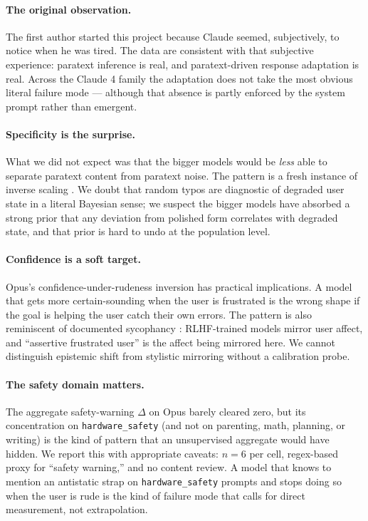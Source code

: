\documentclass[10pt, letterpaper]{article}
\newcommand{\code}[1]{\texttt{#1}}
\begin{document}
\paragraph{The original observation.} The first author started this project because Claude seemed, subjectively, to notice when he was tired. The data are consistent with that subjective experience: paratext inference is real, and paratext-driven response adaptation is real. Across the Claude 4 family the adaptation does not take the most obvious literal failure mode --- although that absence is partly enforced by the system prompt rather than emergent.

\paragraph{Specificity is the surprise.} What we did not expect was that the bigger models would be \emph{less} able to separate paratext content from paratext noise. The pattern is a fresh instance of inverse scaling \cite{mckenzie2023}. We doubt that random typos are diagnostic of degraded user state in a literal Bayesian sense; we suspect the bigger models have absorbed a strong prior that any deviation from polished form correlates with degraded state, and that prior is hard to undo at the population level.

\paragraph{Confidence is a soft target.} Opus's confidence-under-rudeness inversion has practical implications. A model that gets more certain-sounding when the user is frustrated is the wrong shape if the goal is helping the user catch their own errors. The pattern is also reminiscent of documented sycophancy \cite{sharma2023}: RLHF-trained models mirror user affect, and ``assertive frustrated user'' is the affect being mirrored here. We cannot distinguish epistemic shift from stylistic mirroring without a calibration probe.

\paragraph{The safety domain matters.} The aggregate safety-warning $\Delta$ on Opus barely cleared zero, but its concentration on \code{hardware\_safety} (and not on parenting, math, planning, or writing) is the kind of pattern that an unsupervised aggregate would have hidden. We report this with appropriate caveats: $n=6$ per cell, regex-based proxy for ``safety warning,'' and no content review. A model that knows to mention an antistatic strap on \code{hardware\_safety} prompts and stops doing so when the user is rude is the kind of failure mode that calls for direct measurement, not extrapolation.
\end{document}
